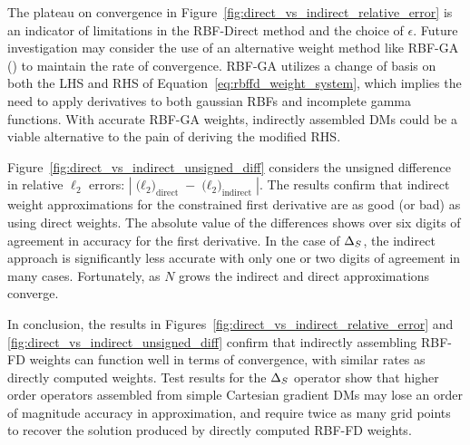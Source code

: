 The plateau on convergence in Figure~\ref{fig:direct_vs_indirect_relative_error} is an indicator of limitations in the RBF-Direct method and the choice of $\epsilon$. Future investigation may consider the use of an alternative weight method like RBF-GA (\cite{Fornberg2012}) to maintain the rate of convergence. RBF-GA utilizes a change of basis on both the LHS and RHS of Equation~\ref{eq:rbffd_weight_system}, which implies the need to apply derivatives to both gaussian RBFs and incomplete gamma functions. With accurate RBF-GA weights, indirectly assembled DMs could be a viable alternative to the pain of deriving the modified RHS. 

Figure~\ref{fig:direct_vs_indirect_unsigned_diff} considers the unsigned difference in relative $\ell_2$ errors: $| \text{($\ell_{2}$)}_{\text{direct}} - \text{($\ell_{2}$)}_{\text{indirect}} |$. The results confirm that indirect weight approximations for the constrained first derivative are as good (or bad) as using direct weights. The absolute value of the differences shows over six digits of agreement in accuracy for the first derivative. In the case of $\Delta_S$, the indirect approach is significantly less accurate with only one or two digits of agreement in many cases. Fortunately, as $N$ grows the indirect and direct approximations converge. 

In conclusion, the results in Figures~\ref{fig:direct_vs_indirect_relative_error} and \ref{fig:direct_vs_indirect_unsigned_diff} confirm that indirectly assembling RBF-FD weights can function well in terms of convergence, with similar rates as directly computed weights. Test results for the $\Delta_S$ operator show that higher order operators assembled from simple Cartesian gradient DMs may lose an order of magnitude accuracy in approximation, and require twice as many grid points to recover the solution produced by directly computed RBF-FD weights. 





